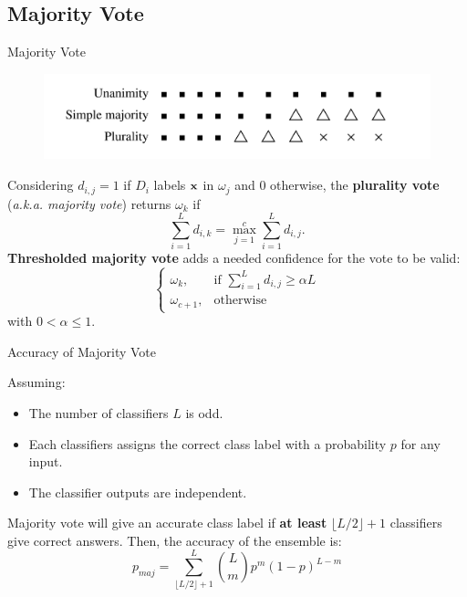 \documentclass[xcolor=table]{beamer}
\begin{document}

\subsection{Majority Vote}
\begin{frame}{Majority Vote}
\begin{figure}
    \centering
    \includegraphics[scale=0.18]{Images/MajorityVote}
    \label{fig:my_label}
\end{figure}
Considering \(d_{i,j} = 1\) if \(D_i\) labels \({\mathbf x}\) in \(\omega_j\) and \(0\) otherwise, the \textbf{plurality vote} (\emph{a.k.a. majority vote}) returns \(\omega_k\) if
\[
\sum_{i=1}^L d_{i,k} = \max_{j=1}^c \sum_{i=1}^L d_{i,j}.
\]
\textbf{Thresholded majority vote} adds a needed confidence for the vote to be valid:
\[
\begin{cases}
    \omega_k, & \text{if } \sum_{i=1}^L d_{i,j} \geq \alpha L \\
    \omega_{c+1}, & \text{otherwise}
\end{cases}
\]
with \(0 < \alpha \leq 1\).
    
\end{frame}

\begin{frame}{Accuracy of Majority Vote}

Assuming:
\begin{itemize}
    \item The number of classifiers \(L\) is odd.
    \item Each classifiers assigns the correct class label with a probability \(p\) for any input.
    \item The classifier outputs are independent.
\end{itemize}

Majority vote will give an accurate class label if \textbf{at least} \(\lfloor L/2 \rfloor + 1\) classifiers give correct answers. Then, the accuracy of the ensemble is:
\begin{equation}
p_{maj} = \sum_{\lfloor L/2\rfloor + 1}^L \binom{L}{m} p^m (1-p)^{L-m}
\end{equation}
\end{frame}
\end{document}
